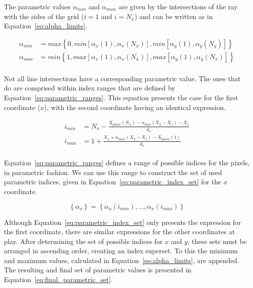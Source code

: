 The parametric values $\alpha_{min}$ and $\alpha_{max}$ are given by the
intersections of the ray with the sides of the grid ($i = 1$ and $i =
N_x$) and can be written as in Equation~\ref{eq:alpha_limits}.

\begin{equation}
    \label{eq:alpha_limits}
    \begin{aligned}
        \alpha_{min} &= max \left\{  0, min \left[  \alpha_x(1),
                \alpha_x(N_x)  \right], min\left[ \alpha_y(1),
                    \alpha_y(N_y)  \right] \right\}\\
        \alpha_{max} &= min\left\{ 1, max\left[ \alpha_x(1),
                \alpha_x(N_x)  \right], max\left[ \alpha_y(1),
                    \alpha_y(N_x) \right]  \right\}\\
    \end{aligned}
\end{equation}

Not all line intersections have a corresponding parametric value. The
ones that do are comprised within index ranges that are defined by
Equation~\ref{eq:parametric_ranges}. This equation presents the case for
the first coordinate ($x$), with the second coordinate having an
identical expression.

\begin{equation}
    \label{eq:parametric_ranges}
    \begin{aligned}
        i_{min} &= N_x - \frac{ X_{plane}(N_x) - \alpha_{min}(X_2 - X_1)
            - X_1 }{d_x}\\
        i_{max} &= 1 + \frac{X_1 + \alpha_{max}(X_2 - X_1) -
            X_{plane}(1)}{d_x}\\
    \end{aligned}
\end{equation}

Equation~\ref{eq:parametric_ranges} defines a range of possible indices
for the pixels, in parametric fashion. We can use this range to
construct the set of used parametric indices, given in
Equation~\ref{eq:parametric_index_set} for the $x$ coordinate. 

\begin{equation}
    \label{eq:parametric_index_set}
    \left\{ \alpha_x \right\} = \left\{ \alpha_x(i_{min}), \ldots,
        \alpha_x(i_{max})  \right\}
\end{equation}

Although Equation~\ref{eq:parametric_index_set} only presents the
expression for the first coordinate, there are similar expressions for
the other coordinates at play. After determining the set of possible
indices for $x$ and $y$, these sets must be arranged in ascending order,
creating an index superset. To this the minimum and maximum values,
calculated in Equation~\ref{eq:alpha_limits}, are appended. The
resulting and final set of parametric values is presented in
Equation~\ref{eq:final_parametric_set}.

